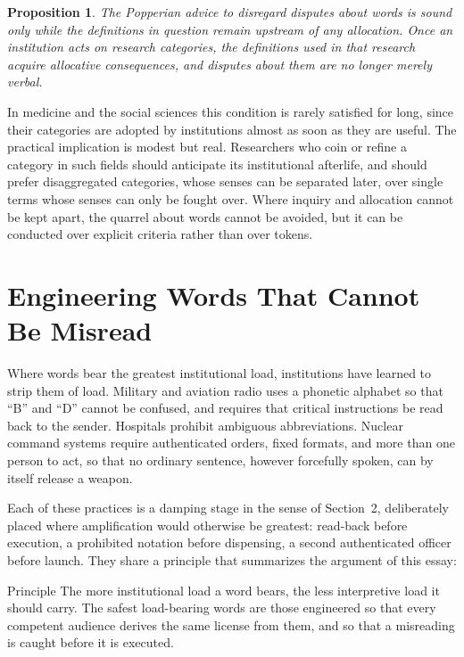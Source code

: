 \documentclass[11pt,a4paper]{article}
\theoremstyle{plain}
\newtheorem{proposition}{Proposition}
\theoremstyle{definition}
\theoremstyle{remark}
\begin{document}
\begin{proposition}
The Popperian advice to disregard disputes about words is sound only while the definitions in question remain upstream of any allocation. Once an institution acts on research categories, the definitions used in that research acquire allocative consequences, and disputes about them are no longer merely verbal.
\end{proposition}

In medicine and the social sciences this condition is rarely satisfied for long, since their categories are adopted by institutions almost as soon as they are useful. The practical implication is modest but real. Researchers who coin or refine a category in such fields should anticipate its institutional afterlife, and should prefer disaggregated categories, whose senses can be separated later, over single terms whose senses can only be fought over. Where inquiry and allocation cannot be kept apart, the quarrel about words cannot be avoided, but it can be conducted over explicit criteria rather than over tokens.

\section{Engineering Words That Cannot Be Misread}\label{sec:engineer}

Where words bear the greatest institutional load, institutions have learned to strip them of load. Military and aviation radio uses a phonetic alphabet so that ``B'' and ``D'' cannot be confused, and requires that critical instructions be read back to the sender. Hospitals prohibit ambiguous abbreviations. Nuclear command systems require authenticated orders, fixed formats, and more than one person to act, so that no ordinary sentence, however forcefully spoken, can by itself release a weapon.

Each of these practices is a damping stage in the sense of Section~2, deliberately placed where amplification would otherwise be greatest: read-back before execution, a prohibited notation before dispensing, a second authenticated officer before launch. They share a principle that summarizes the argument of this essay:

\begin{statusbox}{Principle}
The more institutional load a word bears, the less interpretive load it should carry. The safest load-bearing words are those engineered so that every competent audience derives the same license from them, and so that a misreading is caught before it is executed.
\end{statusbox}
\end{document}
